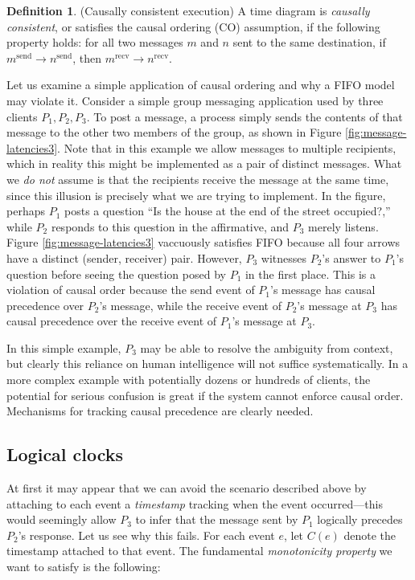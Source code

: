 \documentclass[]             %
{NASA}                       %
\theoremstyle{definition}
\newtheorem{definition}{Definition}[section]
\begin{document}
\begin{definition}(Causally consistent execution)
  A time diagram is \emph{causally consistent}, or satisfies the
  causal ordering (CO) assumption, if the following property holds:
  for all two messages $m$ and $n$ sent to the same destination, if
  $m^\textrm{send} \to n^\textrm{send}$, then $m^\textrm{recv} \to
  n^\textrm{recv}$.
\end{definition}

Let us examine a simple application of causal ordering and why a FIFO
model may violate it. Consider a simple group messaging application
used by three clients $P_1, P_2, P_3$. To post a message, a process
simply sends the contents of that message to the other two members of
the group, as shown in Figure \ref{fig:message-latencies3}. Note that
in this example we allow messages to multiple recipients, which in
reality this might be implemented as a pair of distinct messages. What
we \emph{do not} assume is that the recipients receive the message at
the same time, since this illusion is precisely what we are trying to
implement. In the figure, perhaps $P_1$ posts a question ``Is the
house at the end of the street occupied?,'' while $P_2$ responds to
this question in the affirmative, and $P_3$ merely listens. Figure
\ref{fig:message-latencies3} vaccuously satisfies FIFO because all
four arrows have a distinct (sender, receiver) pair. However, $P_3$
witnesses $P_2$'s answer to $P_1$'s question before seeing the
question posed by $P_1$ in the first place. This is a violation of
causal order because the send event of $P_1$'s message has causal
precedence over $P_2$'s message, while the receive event of $P_2$'s
message at $P_3$ has causal precedence over the receive event of
$P_1$'s message at $P_3$.

In this simple example, $P_3$ may be able to resolve the ambiguity
from context, but clearly this reliance on human intelligence will not
suffice systematically. In a more complex example with potentially
dozens or hundreds of clients, the potential for serious confusion is
great if the system cannot enforce causal order. Mechanisms for
tracking causal precedence are clearly needed.

\subsection{Logical clocks}
At first it may appear that we can avoid the scenario described above
by attaching to each event a \emph{timestamp} tracking when the event
occurred---this would seemingly allow $P_3$ to infer that the message
sent by $P_1$ logically precedes $P_2$'s response. Let us see why this
fails. For each event $e$, let $C(e)$ denote the timestamp attached to
that event. The fundamental \emph{monotonicity property} we want to
satisfy is the following:
\end{document}
